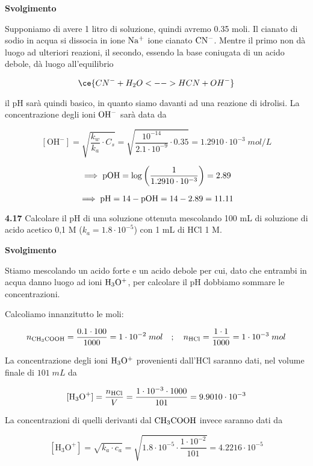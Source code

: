\vspace{0.2cm}\large\textbf{Svolgimento}\normalsize

\vspace{0.2cm}Supponiamo di avere 1 litro di soluzione, quindi avremo 0.35 moli. Il cianato di sodio in acqua si dissocia in ione $\rm Na^+$ ione cianato $\rm CN^-$. Mentre il primo non dà luogo ad ulteriori reazioni, il secondo, essendo la base coniugata di un acido debole, dà luogo all'equilibrio

$$\ce{CN^- + H_2O <--> HCN + OH^-}$$

il pH sarà quindi basico, in quanto siamo davanti ad una reazione di idrolisi. La concentrazione degli ioni $\rm OH^-$ sarà data da


$$[\text{OH}^-]
=\sqrt{\frac{k_w}{k_a}\cdot C_s}
=\sqrt{\frac{10^{-14}}{2.1 \cdot 10^{-9}} \cdot 0.35}
=1.2910 \cdot 10^{-3}\;mol/L$$

$$\implies \rm pOH
=\log{\left(\frac{1}{1.2910 \cdot 10^{-3}}\right)}
=2.89$$

$$\implies \rm pH=14-pOH=14-2.89=11.11$$

\vspace{0.2cm}\textbf{4.17} Calcolare il pH di una soluzione ottenuta mescolando 100 mL di soluzione di acido acetico 0,1 M ($k_a=1.8 \cdot 10^{-5}$) con 1 mL di HCl 1 M.

\vspace{0.2cm}\large\textbf{Svolgimento}\normalsize

\vspace{0.2cm}Stiamo mescolando un acido forte e un acido debole per cui, dato che entrambi in acqua danno luogo ad ioni $\rm H_3O^+$, per calcolare il pH dobbiamo sommare le concentrazioni.

Calcoliamo innanzitutto le moli:

$$n_{\rm CH_3COOH}=\frac{0.1 \cdot 100}{1000}=1 \cdot 10^{-2}\;mol
\quad;\quad
n_{\rm HCl}=\frac{1 \cdot 1}{1000}=1 \cdot 10^{-3}\;mol$$

La concentrazione degli ioni $\rm H_3O^+$ provenienti dall'HCl saranno dati, nel volume finale di $101\;mL$ da

$$[\text{H}_3\text{O}^+]=\frac{n_{\rm HCl}}{V}
=\frac{1 \cdot 10^{-3} \cdot 1000}{101}
=9.9010\cdot 10^{-3}$$

La concentrazioni di quelli derivanti dal $\rm CH_3COOH$ invece saranno dati da

$$[\text{H}_3\text{O}^+]=\sqrt{k_a \cdot c_a}
=\sqrt{1.8 \cdot 10^{-5}\cdot \frac{1 \cdot 10^{-2}}{101}}
=4.2216 \cdot 10^{-5}$$

